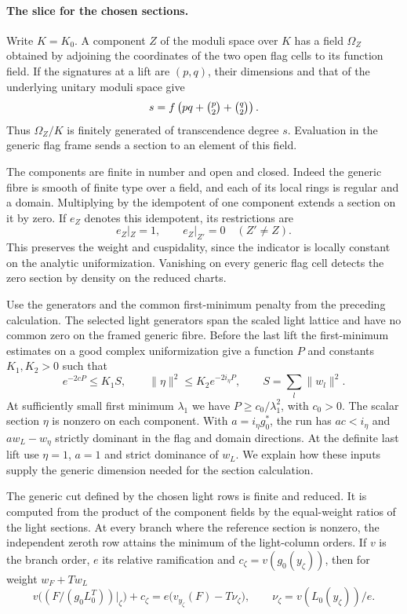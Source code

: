 

\paragraph{The slice for the chosen sections.}
Write \(K=K_0\). A component \(Z\) of the moduli space over \(K\)
has a field \(\Omega_Z\) obtained by adjoining the coordinates of the
two open flag cells to its function field. If the signatures at a lift
are \((p,q)\), their dimensions and that of the underlying unitary
moduli space give
\[
 s=f\left(pq+\tbinom p2+\tbinom q2\right).
\]
Thus \(\Omega_Z/K\) is finitely generated of transcendence degree
\(s\). Evaluation in the generic flag frame sends a section to an
element of this field.

The components are finite in number and
open and closed. Indeed the generic fibre is smooth of finite type
over a field, and each of its local rings is regular and a domain.
Multiplying by the idempotent of one component extends a section
on it by zero.
If \(e_Z\) denotes this idempotent, its restrictions are
\[
  e_Z|_Z=1,\qquad e_Z|_{Z'}=0\quad(Z'\ne Z).
\]
 This preserves the weight and cuspidality, since the
indicator is locally constant on the analytic uniformization.
Vanishing on every generic flag cell detects the zero section by
density on the reduced charts.

Use the generators and the common first-minimum penalty from
the preceding calculation. The selected light generators span the scaled light lattice
and have no common zero on the framed generic fibre. Before the last
lift the first-minimum estimates on a good complex uniformization give
a function \(P\) and constants \(K_1,K_2>0\) such that
\[
 e^{-2cP}\le K_1 S,\qquad \|\eta\|^2\le K_2 e^{-2i_\eta P},
 \qquad S=\sum_l\|w_l\|^2.
\]
At sufficiently small first minimum \(\lambda_1\) we have
\(P\ge c_0/\lambda_1^2\), with \(c_0>0\).
The scalar section \(\eta\) is nonzero on each component.
With \(a=i_\eta g_0^*\), the run has \(ac<i_\eta\) and
\(a w_L-w_\eta\) strictly dominant in the flag and domain
directions. At the definite last lift use \(\eta=1\), \(a=1\)
and strict dominance of \(w_L\). We explain how these inputs
supply the generic dimension needed for the section calculation.
\label{cor:selected-slice-1}

\begin{proposition}
\label{prop:selected-generic-cut}
The generic cut defined by the chosen light rows is finite and reduced.
It is computed from the product of the component fields by the
equal-weight ratios of the light sections. At every branch where
the reference section is nonzero, the independent zeroth row attains
the minimum of the light-column orders. If \(v\) is the branch order,
\(e\) its relative ramification and \(c_\zeta=v(g_0(y_\zeta))\), then
for weight \(w_F+Tw_L\)
\[
 v\big((F/(g_0L_0^T))|_\zeta\big)+c_\zeta
      =e\big(v_{y_\zeta}(F)-T\nu_\zeta\big),
 \qquad \nu_\zeta=v(L_0(y_\zeta))/e.
\]
\end{proposition}

